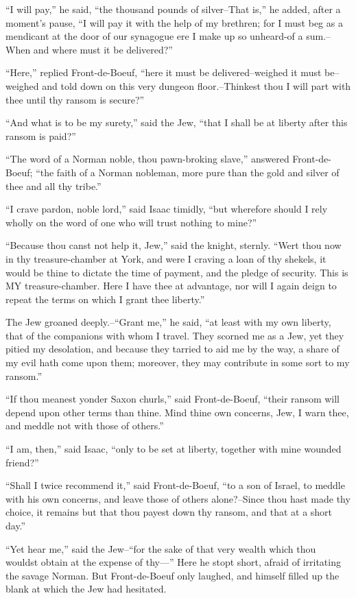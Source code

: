 ``I will pay,'' he said, ``the thousand pounds of silver--That is,'' he
added, after a moment's pause, ``I will pay it with the help of my
brethren; for I must beg as a mendicant at the door of our synagogue ere
I make up so unheard-of a sum.--When and where must it be delivered?''

``Here,'' replied Front-de-Boeuf, ``here it must be delivered--weighed
it must be--weighed and told down on this very dungeon floor.--Thinkest
thou I will part with thee until thy ransom is secure?''

``And what is to be my surety,'' said the Jew, ``that I shall be at
liberty after this ransom is paid?''

``The word of a Norman noble, thou pawn-broking slave,'' answered
Front-de-Boeuf; ``the faith of a Norman nobleman, more pure than the
gold and silver of thee and all thy tribe.''

``I crave pardon, noble lord,'' said Isaac timidly, ``but wherefore
should I rely wholly on the word of one who will trust nothing to
mine?''

``Because thou canst not help it, Jew,'' said the knight, sternly.
``Wert thou now in thy treasure-chamber at York, and were I craving a
loan of thy shekels, it would be thine to dictate the time of payment,
and the pledge of security. This is MY treasure-chamber. Here I have
thee at advantage, nor will I again deign to repeat the terms on which I
grant thee liberty.''

The Jew groaned deeply.--``Grant me,'' he said, ``at least with my own
liberty, that of the companions with whom I travel. They scorned me as a
Jew, yet they pitied my desolation, and because they tarried to aid me
by the way, a share of my evil hath come upon them; moreover, they may
contribute in some sort to my ransom.''

``If thou meanest yonder Saxon churls,'' said Front-de-Boeuf, ``their
ransom will depend upon other terms than thine. Mind thine own concerns,
Jew, I warn thee, and meddle not with those of others.''

``I am, then,'' said Isaac, ``only to be set at liberty, together with
mine wounded friend?''

``Shall I twice recommend it,'' said Front-de-Boeuf, ``to a son of
Israel, to meddle with his own concerns, and leave those of others
alone?--Since thou hast made thy choice, it remains but that thou payest
down thy ransom, and that at a short day.''

``Yet hear me,'' said the Jew--``for the sake of that very wealth which
thou wouldst obtain at the expense of thy---'' Here he stopt short,
afraid of irritating the savage Norman. But Front-de-Boeuf only laughed,
and himself filled up the blank at which the Jew had hesitated.

